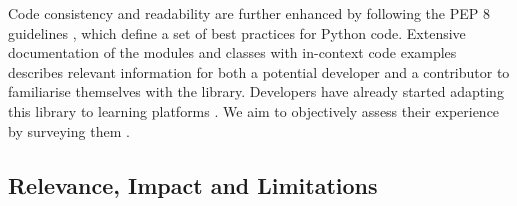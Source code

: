 \documentclass[letterpaper]{article} %
\begin{document}

Code consistency and readability are further enhanced by following the PEP 8 guidelines \cite{pep8}, which define a set of best practices for Python code. Extensive documentation
of the modules and classes with in-context code examples describes relevant information for both a potential developer and a contributor to familiarise themselves with the library. Developers have already started adapting this library to learning platforms \cite{x5learn}. We aim to objectively assess their experience by surveying them \cite{piccioni2013empirical,nadi2023selecting}.




\subsection{Relevance, Impact and Limitations}
\end{document}
